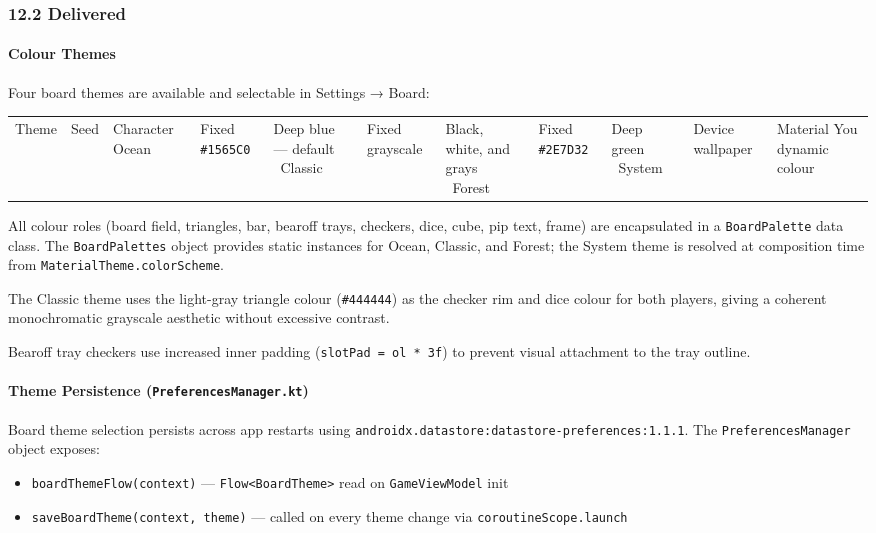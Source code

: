 \documentclass[11pt,a4paper]{article}
\providecommand{\tightlist}{\setlength{\itemsep}{2pt}\setlength{\parskip}{0pt}}
\begin{document}
\subsubsection{12.2 Delivered}\label{delivered-v092}

\paragraph{Colour Themes}\label{colour-themes-v092}

Four board themes are available and selectable in Settings → Board:

\begin{longtable}[]{@{}lll@{}}
\toprule\noalign{}
Theme & Seed & Character \
\midrule\noalign{}
\endhead
\bottomrule\noalign{}
\endlastfoot
Ocean & Fixed \texttt{\#1565C0} & Deep blue --- default \
Classic & Fixed grayscale & Black, white, and grays \
Forest & Fixed \texttt{\#2E7D32} & Deep green \
System & Device wallpaper & Material You dynamic colour \
\end{longtable}

All colour roles (board field, triangles, bar, bearoff trays, checkers,
dice, cube, pip text, frame) are encapsulated in a \texttt{BoardPalette}
data class. The \texttt{BoardPalettes} object provides static instances
for Ocean, Classic, and Forest; the System theme is resolved at
composition time from \texttt{MaterialTheme.colorScheme}.

The Classic theme uses the light-gray triangle colour (\texttt{\#444444})
as the checker rim and dice colour for both players, giving a coherent
monochromatic grayscale aesthetic without excessive contrast.

Bearoff tray checkers use increased inner padding (\texttt{slotPad = ol
* 3f}) to prevent visual attachment to the tray outline.

\paragraph{Theme Persistence
(\texttt{PreferencesManager.kt})}\label{theme-persistence}

Board theme selection persists across app restarts using
\texttt{androidx.datastore:datastore-preferences:1.1.1}. The
\texttt{PreferencesManager} object exposes:

\begin{itemize}
\tightlist
\item
  \texttt{boardThemeFlow(context)} --- \texttt{Flow<BoardTheme>} read
  on \texttt{GameViewModel} init
\item
  \texttt{saveBoardTheme(context, theme)} --- called on every theme
  change via \texttt{coroutineScope.launch}
\end{itemize}
\end{document}
